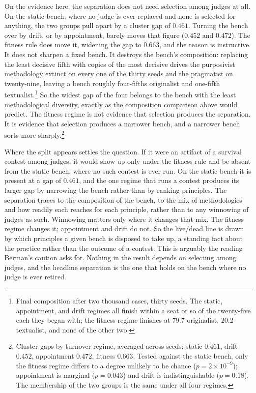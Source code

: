 On the evidence here, the separation does not need selection among judges at
all. On the static bench, where no judge is ever replaced and none is selected
for anything, the two groups pull apart by a cluster gap of $0.461$. Turning the bench over by drift, or by appointment, barely moves that figure
($0.452$ and $0.472$). The fitness rule does move it, widening the gap to
$0.663$, and the reason is instructive. It does not sharpen a fixed bench. It
destroys the bench's composition: replacing the least decisive fifth with
copies of the most decisive drives the purposivist methodology extinct on
every one of the thirty seeds and the pragmatist on twenty-nine, leaving a
bench roughly four-fifths originalist and one-fifth textualist.\footnote{Final
composition after two thousand cases, thirty seeds. The static, appointment,
and drift regimes all finish within a seat or so of the twenty-five each they
began with; the fitness regime finishes at $79.7$ originalist, $20.2$
textualist, and none of the other two.} So the widest gap of the four belongs
to the bench with the least methodological diversity, exactly as the
composition comparison above would predict. The fitness regime is not evidence that
selection produces the separation. It is evidence that selection produces a
narrower bench, and a narrower bench sorts more sharply.\footnote{Cluster gaps by turnover regime, averaged across seeds: static $0.461$, drift
$0.452$, appointment $0.472$, fitness $0.663$. Tested against the static
bench, only the fitness regime differs to a degree unlikely to be chance ($p =
2\times10^{-9}$); appointment is marginal ($p = 0.043$) and drift is
indistinguishable ($p = 0.18$). The membership of the two groups is the same
under all four regimes.}

Where the split appears settles the question. If it were an artifact of a
survival contest among judges, it would show up only under the fitness rule
and be absent from the static bench, where no such contest is ever run. On the
static bench it is present at a gap of $0.461$, and the one regime
that runs a contest produces its larger gap by narrowing the bench rather than
by ranking principles. The separation traces to the composition of the bench, to the mix of
methodologies and how readily each reaches for each principle, rather than to
any winnowing of judges as such. Winnowing matters only where it changes that
mix. The fitness regime changes it; appointment and drift do not. So
the live/dead line is drawn by which principles a given bench is disposed to
take up, a standing fact about the practice rather than the outcome of a
contest. This is arguably the reading Berman's caution asks for. Nothing in the result depends on selecting among
judges, and the headline separation is the one that holds on the bench where
no judge is ever retired.

